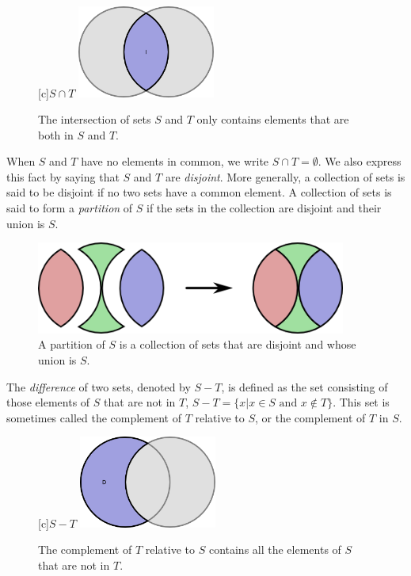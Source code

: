 \begin{figure}[htb!]
\begin{center}
\begin{psfrags}
[c]{$S \cap T$}
\includegraphics[height=3.03cm]{Figures/1Chapter/intersection}
\end{psfrags}
\caption{The intersection of sets $S$ and $T$ only contains elements that are both in $S$ and $T$.}
\end{center}
\end{figure}

When $S$ and $T$ have no elements in common, we write $S \cap T = \emptyset$.
We also express this fact by saying that $S$ and $T$ are \emph{disjoint}.
More generally, a collection of sets is said to be disjoint if no two sets have a common element.
A collection of sets is said to form a \emph{partition} of $S$ if the sets in the collection are disjoint and their union is $S$.

\begin{figure}[htb]
\begin{center}
\includegraphics[height=3.03cm]{Figures/1Chapter/setpartition}
\caption{A partition of $S$ is a collection of sets that are disjoint and whose union is $S$.}
\end{center}
\end{figure}

The \emph{difference} of two sets, denoted by $S - T$, is defined as the set consisting of those elements of $S$ that are not in $T$, $S - T = \{ x | x \in S \text{ and } x \notin T \}$.
This set is sometimes called the complement of $T$ relative to $S$, or the complement of $T$ in $S$.

\begin{figure}[htb]
\begin{center}
\begin{psfrags}
[c]{$S - T$}
\includegraphics[height=3.03cm]{Figures/1Chapter/difference}
\end{psfrags}
\caption{The complement of $T$ relative to $S$ contains all the elements of $S$ that are not in $T$.}
\end{center}
\end{figure}

